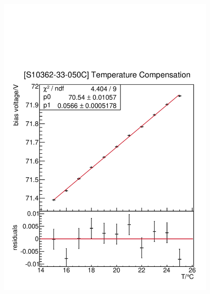 \begin{figure}[h]
	\centering
	\begin{minipage}[b]{0.49\textwidth}
		\includegraphics[width = 0.98\textwidth]{Figures/radermacher/TempReg_S10362.pdf}
	\end{minipage}	
	\begin{minipage}[b]{0.49\textwidth}

\end{minipage}
\end{figure}
